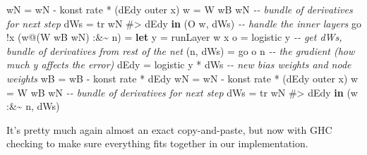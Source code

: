 \documentclass[]{article}
\newenvironment{Shaded}{}{}
\newcommand{\CommentTok}[1]{\textcolor[rgb]{0.38,0.63,0.69}{\textit{#1}}}
\newcommand{\DataTypeTok}[1]{\textcolor[rgb]{0.56,0.13,0.00}{#1}}
\newcommand{\KeywordTok}[1]{\textcolor[rgb]{0.00,0.44,0.13}{\textbf{#1}}}
\newcommand{\NormalTok}[1]{#1}
\newcommand{\OperatorTok}[1]{\textcolor[rgb]{0.40,0.40,0.40}{#1}}
\newcommand{\OtherTok}[1]{\textcolor[rgb]{0.00,0.44,0.13}{#1}}
\begin{document}
\begin{Shaded}
\begin{Highlighting}[]
\NormalTok{              wN\textquotesingle{}  }\OtherTok{=}\NormalTok{ wN }\OperatorTok{{-}}\NormalTok{ konst rate }\OperatorTok{*}\NormalTok{ (dEdy }\OtherTok{\textasciigrave{}outer\textasciigrave{}}\NormalTok{ x)}
\NormalTok{              w\textquotesingle{}   }\OtherTok{=} \DataTypeTok{W}\NormalTok{ wB\textquotesingle{} wN\textquotesingle{}}
              \CommentTok{{-}{-} bundle of derivatives for next step}
\NormalTok{              dWs  }\OtherTok{=}\NormalTok{ tr wN }\OperatorTok{\#>}\NormalTok{ dEdy}
          \KeywordTok{in}\NormalTok{  (}\DataTypeTok{O}\NormalTok{ w\textquotesingle{}, dWs)}
    \CommentTok{{-}{-} handle the inner layers}
\NormalTok{    go }\OperatorTok{!}\NormalTok{x (w}\OperatorTok{@}\NormalTok{(}\DataTypeTok{W}\NormalTok{ wB wN) }\OperatorTok{:\&\textasciitilde{}}\NormalTok{ n)}
        \OtherTok{=} \KeywordTok{let}\NormalTok{ y          }\OtherTok{=}\NormalTok{ runLayer w x}
\NormalTok{              o          }\OtherTok{=}\NormalTok{ logistic y}
              \CommentTok{{-}{-} get dWs\textquotesingle{}, bundle of derivatives from rest of the net}
\NormalTok{              (n\textquotesingle{}, dWs\textquotesingle{}) }\OtherTok{=}\NormalTok{ go o n}
              \CommentTok{{-}{-} the gradient (how much y affects the error)}
\NormalTok{              dEdy       }\OtherTok{=}\NormalTok{ logistic\textquotesingle{} y }\OperatorTok{*}\NormalTok{ dWs\textquotesingle{}}
              \CommentTok{{-}{-} new bias weights and node weights}
\NormalTok{              wB\textquotesingle{}  }\OtherTok{=}\NormalTok{ wB }\OperatorTok{{-}}\NormalTok{ konst rate }\OperatorTok{*}\NormalTok{ dEdy}
\NormalTok{              wN\textquotesingle{}  }\OtherTok{=}\NormalTok{ wN }\OperatorTok{{-}}\NormalTok{ konst rate }\OperatorTok{*}\NormalTok{ (dEdy }\OtherTok{\textasciigrave{}outer\textasciigrave{}}\NormalTok{ x)}
\NormalTok{              w\textquotesingle{}   }\OtherTok{=} \DataTypeTok{W}\NormalTok{ wB\textquotesingle{} wN\textquotesingle{}}
              \CommentTok{{-}{-} bundle of derivatives for next step}
\NormalTok{              dWs  }\OtherTok{=}\NormalTok{ tr wN }\OperatorTok{\#>}\NormalTok{ dEdy}
          \KeywordTok{in}\NormalTok{  (w\textquotesingle{} }\OperatorTok{:\&\textasciitilde{}}\NormalTok{ n\textquotesingle{}, dWs)}
\end{Highlighting}
\end{Shaded}

It's pretty much again almost an exact copy-and-paste, but now with GHC checking
to make sure everything fits together in our implementation.
\end{document}

